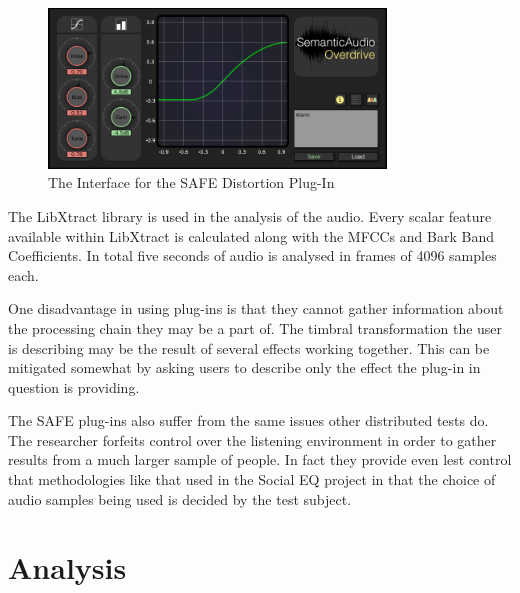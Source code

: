 		\begin{figure}[h!]
			\centering
			\includegraphics[width=0.8\textwidth]{chapter4/Images/SAFEDistortion.png}
			\caption{The Interface for the SAFE Distortion Plug-In}
			\label{fig:SAFE-Distortion}
		\end{figure}

		The LibXtract library \citep{bullock2007libxtract} is used in the analysis of the audio. Every scalar
		feature available within LibXtract is calculated along with the MFCCs and Bark Band Coefficients. In total
		five seconds of audio is analysed in frames of 4096 samples each.


		One disadvantage in using plug-ins is that they cannot gather information about the processing chain they
		may be a part of. The timbral transformation the user is describing may be the result of several effects
		working together. This can be mitigated somewhat by asking users to describe only the effect the plug-in in
		question is providing.

		The SAFE plug-ins also suffer from the same issues other distributed tests do. The researcher forfeits
		control over the listening environment in order to gather results from a much larger sample of people. In
		fact they provide even lest control that methodologies like that used in the Social EQ project
		\citep{cartwright2013socialeq} in that the choice of audio samples being used is decided by the test
		subject. 

\section{Analysis}
\label{sec:ListeningTests-Analysis}

